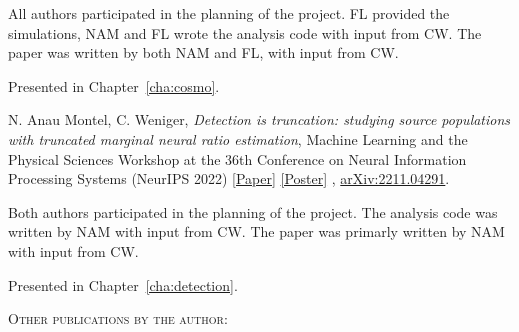 \begin{itemize}[]
{{All authors participated in the planning of the project. FL provided the simulations, NAM and FL wrote the analysis code with input from CW. The paper was written by both NAM and FL, with input from CW.}   \vskip 4pt

Presented in Chapter~\ref{cha:cosmo}. \vskip 4pt


\item[\cite{AnauMontel:2022ppb}] 
{N. Anau Montel}, C. Weniger, \textit{Detection is truncation: studying source populations with truncated marginal neural ratio estimation}, Machine Learning and the Physical Sciences Workshop at the 36th Conference on Neural Information Processing Systems (NeurIPS 2022) \href{https://ml4physicalsciences.github.io/2022/files/NeurIPS_ML4PS_2022_50.pdf}{[Paper]} \href{https://neurips.cc/media/PosterPDFs/NeurIPS%202022/57017.png}{[Poster]} , \href{https://arxiv.org/abs/2211.04291}{\ttfamily arXiv:2211.04291}.  \vskip 4pt

{Both authors participated in the planning of the project. The analysis code was written by NAM with input from CW. The paper was primarly written by NAM with input from CW.}   \vskip 4pt

Presented in Chapter~\ref{cha:detection}. \vskip 4pt

}

\end{itemize}


{\scshape Other publications by the author:} \vskip 14pt

